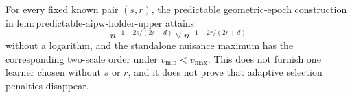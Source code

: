 For every fixed known pair \((s,r)\), the predictable geometric-epoch construction in \(\mathrm{lem{:}predictable\text{-}aipw\text{-}holder\text{-}upper}\) attains
\[
n^{-1-2s/(2s+d)}\vee n^{-1-2r/(2r+d)}
\]
without a logarithm, and the standalone nuisance maximum has the corresponding two-scale order under \(v_{\min}<v_{\max}\).  This does not furnish one learner chosen without \(s\) or \(r\), and it does not prove that adaptive selection penalties disappear.